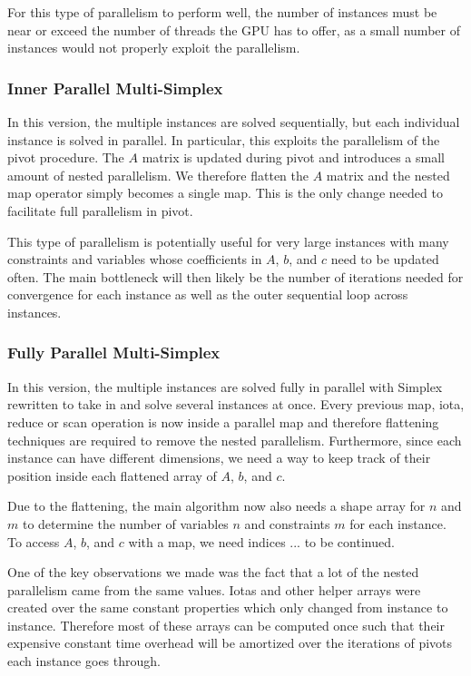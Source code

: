 For this type of parallelism to perform well, the number of instances must be near or exceed the number of threads the GPU has to offer, as a small number of instances would not properly exploit the parallelism.

\subsubsection{Inner Parallel Multi-Simplex}
In this version, the multiple instances are solved sequentially, but each individual instance is solved in parallel. In particular, this exploits the parallelism of the pivot procedure. The $A$ matrix is updated during pivot and introduces a small amount of nested parallelism. We therefore flatten the $A$ matrix and the nested map operator simply becomes a single map. This is the only change needed to facilitate full parallelism in pivot.

This type of parallelism is potentially useful for very large instances with many constraints and variables whose coefficients in $A$, $b$, and $c$ need to be updated often. The main bottleneck will then likely be the number of iterations needed for convergence for each instance as well as the outer sequential loop across instances.

\subsubsection{Fully Parallel Multi-Simplex}
In this version, the multiple instances are solved fully in parallel with Simplex rewritten to take in and solve several instances at once. Every previous map, iota, reduce or scan operation is now inside a parallel map and therefore flattening techniques are required to remove the nested parallelism. Furthermore, since each instance can have different dimensions, we need a way to keep track of their position inside each flattened array of $A$, $b$, and $c$.

\newpar
Due to the flattening, the main algorithm now also needs a shape array for $n$ and $m$ to determine the number of variables $n$ and constraints $m$ for each instance. To access $A$, $b$, and $c$ with a map, we need indices ... to be continued.

One of the key observations we made was the fact that a lot of the nested parallelism came from the same values. Iotas and other helper arrays were created over the same constant properties which only changed from instance to instance. Therefore most of these arrays can be computed once such that their expensive constant time overhead will be amortized over the iterations of pivots each instance goes through.

